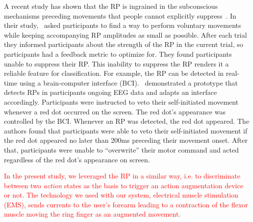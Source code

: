 A recent study has shown that the RP is ingrained in the subconscious mechanisms preceding movements that people cannot explicitly suppress~\cite{Schultze-Kraft2021-cu}. In their study,~\citet{Schultze-Kraft2021-cu} asked participants to find a way to perform voluntary movements while keeping accompanying RP amplitudes as small as possible. After each trial they informed participants about the strength of the RP in the current trial, so participants had a feedback metric to optimize for. They found participants unable to suppress their RP. This inability to suppress the RP renders it a reliable feature for classification. For example, the RP can be detected in real-time using a brain-computer interface (BCI).~\citet{Schultze-Kraft2016-bx} demonstrated a prototype that detects RPs in participants ongoing EEG data and adapts an interface accordingly. Participants were instructed to veto their self-initiated movement whenever a red dot occurred on the screen. The red dot's appearance was controlled by the BCI. Whenever an RP was detected, the red dot appeared. The authors found that participants were able to veto their self-initiated movement if the red dot appeared no later than 200ms preceding their movement onset. After that, participants were unable to ``overwrite'' their motor command and acted regardless of the red dot's appearance on screen.

\textcolor{red}{In the present study, we leveraged the RP in a similar way, i.e. to discriminate between two \textit{action} states as the basis to trigger an action augmentation device or not. The technology we used with our system, electrical muscle stimulation (EMS), sends currents to the user's forearm leading to a contraction of the flexor muscle moving the ring finger as an augmented movement.}

